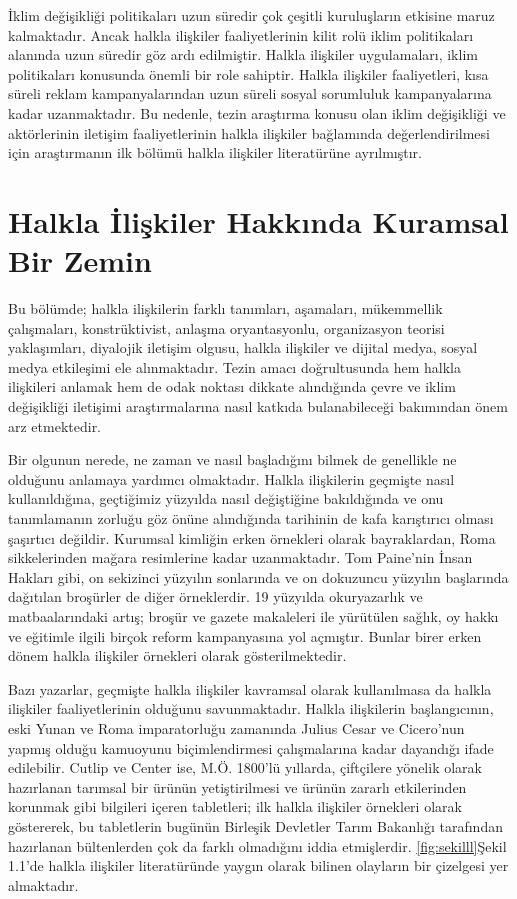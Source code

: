 \documentclass[
]{book}
\begin{document}
İklim değişikliği politikaları uzun süredir çok çeşitli kuruluşların etkisine maruz kalmaktadır. Ancak halkla ilişkiler faaliyetlerinin kilit rolü iklim politikaları alanında uzun süredir göz ardı edilmiştir. Halkla ilişkiler uygulamaları, iklim politikaları konusunda önemli bir role sahiptir. Halkla ilişkiler faaliyetleri, kısa süreli reklam kampanyalarından uzun süreli sosyal sorumluluk kampanyalarına kadar uzanmaktadır.\citep{brulle2021role} Bu nedenle, tezin araştırma konusu olan iklim değişikliği ve aktörlerinin iletişim faaliyetlerinin halkla ilişkiler bağlamında değerlendirilmesi için araştırmanın ilk bölümü halkla ilişkiler literatürüne ayrılmıştır.

\hypertarget{halkla-iliux15fkiler-hakkux131nda-kuramsal-bir-zemin}{%
\section{Halkla İlişkiler Hakkında Kuramsal Bir Zemin}\label{halkla-iliux15fkiler-hakkux131nda-kuramsal-bir-zemin}}

Bu bölümde; halkla ilişkilerin farklı tanımları, aşamaları, mükemmellik çalışmaları, konstrüktivist, anlaşma oryantasyonlu, organizasyon teorisi yaklaşımları, diyalojik iletişim olgusu, halkla ilişkiler ve dijital medya, sosyal medya etkileşimi ele alınmaktadır. Tezin amacı doğrultusunda hem halkla ilişkileri anlamak hem de odak noktası dikkate alındığında çevre ve iklim değişikliği iletişimi araştırmalarına nasıl katkıda bulanabileceği bakımından önem arz etmektedir.

Bir olgunun nerede, ne zaman ve nasıl başladığını bilmek de genellikle ne olduğunu anlamaya yardımcı olmaktadır. Halkla ilişkilerin geçmişte nasıl kullanıldığına, geçtiğimiz yüzyılda nasıl değiştiğine bakıldığında ve onu tanımlamanın zorluğu göz önüne alındığında tarihinin de kafa karıştırıcı olması şaşırtıcı değildir. Kurumsal kimliğin erken örnekleri olarak bayraklardan, Roma sikkelerinden mağara resimlerine kadar uzanmaktadır. Tom Paine'nin İnsan Hakları gibi, on sekizinci yüzyılın sonlarında ve on dokuzuncu yüzyılın başlarında dağıtılan broşürler de diğer örneklerdir. 19 yüzyılda okuryazarlık ve matbaalarındaki artış; broşür ve gazete makaleleri ile yürütülen sağlık, oy hakkı ve eğitimle ilgili birçok reform kampanyasına yol açmıştır. Bunlar birer erken dönem halkla ilişkiler örnekleri olarak gösterilmektedir. \citep{theaker2016public}

Bazı yazarlar, geçmişte halkla ilişkiler kavramsal olarak kullanılmasa da halkla ilişkiler faaliyetlerinin olduğunu savunmaktadır. Halkla ilişkilerin başlangıcının, eski Yunan ve Roma imparatorluğu zamanında Julius Cesar ve Cicero'nun yapmış olduğu kamuoyunu biçimlendirmesi çalışmalarına kadar dayandığı ifade edilebilir. Cutlip ve Center ise, M.Ö. 1800'lü yıllarda, çiftçilere yönelik olarak hazırlanan tarımsal bir ürünün yetiştirilmesi ve ürünün zararlı etkilerinden korunmak gibi bilgileri içeren tabletleri; ilk halkla ilişkiler örnekleri olarak göstererek, bu tabletlerin bugünün Birleşik Devletler Tarım Bakanlığı tarafından hazırlanan bültenlerden çok da farklı olmadığını iddia etmişlerdir.\citep{peltekoglu2016halkla} \ref{fig:sekilll}Şekil 1.1'de halkla ilişkiler literatüründe yaygın olarak bilinen olayların bir çizelgesi yer almaktadır.
\end{document}
